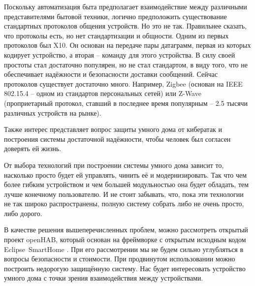 Поскольку автоматизация быта предполагает взаимодействие между различными представителями бытовой техники, логично предположить существование стандартных протоколов общения устройств.
Но это не так. Правильнее сказать, что протоколы есть, но нет стандартизации и общности.
Одним из первых протоколов был X10. Он основан на передаче пары датаграмм, первая из которых кодирует устройство, а вторая -- команду для этого устройства.
В силу своей простоты стал достаточно популярен, но не стал стандартом, в виду того, что не обеспечивает надёжности и безопасности доставки сообщений.
Сейчас протоколов существует достаточно много. Например, Zigbee \cite{ZigBeeDoc} (основан на IEEE 802.15.4 -- одном из стандартов персональных сетей) или Z-Wave \cite{ZWaveDoc} (проприетарный протокол, ставший в последнее время популярным -- 2.5 тысячи различных устройств на рынке).

Также интерес представляет вопрос защиты умного дома от кибератак и построения системы достаточной надёжности, чтобы человек был согласен доверять ей жизнь.

От выбора технологий при построении системы умного дома зависит то, насколько просто будет ей управлять, чинить её и модернизировать.
Так что чем более гибким устройством и чем большей модульностью она будет обладать, тем лучше конечному пользователю.
И не стоит забывать, что, пока эти технологии не так широко распространены, полную систему собрать либо не очень просто, либо дорого.

В качестве решения вышеперечисленных проблем, можно рассмотреть открытый проект openHAB, который основан на фреймворке с открытым исходным кодом Eclipse~SmartHome \cite{EclipseSmartHomeGitHub}.
При его рассмотрении мы не будем сильно углубляться в вопросы безопасности и стоимости.
При продвинутом использовании можно построить недорогую защищённую систему.
Нас будет интересовать устройство умного дома с точки зрения взаимодействия между устройствами.
